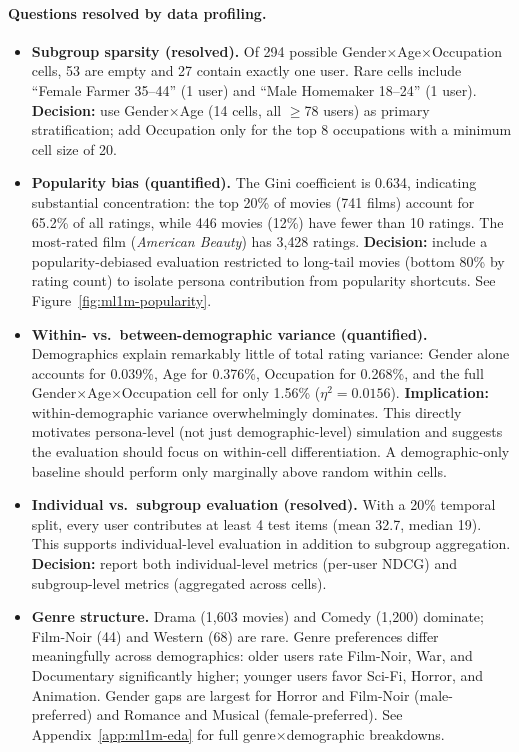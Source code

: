 \paragraph{Questions resolved by data profiling.}
\begin{itemize}
    \item \textbf{Subgroup sparsity (resolved).} Of 294 possible Gender$\times$Age$\times$Occupation cells, 53 are empty and 27 contain exactly one user. Rare cells include ``Female Farmer 35--44'' (1 user) and ``Male Homemaker 18--24'' (1 user). \textbf{Decision:} use Gender$\times$Age (14 cells, all $\geq$78 users) as primary stratification; add Occupation only for the top 8 occupations with a minimum cell size of 20.
    \item \textbf{Popularity bias (quantified).} The Gini coefficient is 0.634, indicating substantial concentration: the top 20\% of movies (741 films) account for 65.2\% of all ratings, while 446 movies (12\%) have fewer than 10 ratings. The most-rated film (\emph{American Beauty}) has 3{,}428 ratings. \textbf{Decision:} include a popularity-debiased evaluation restricted to long-tail movies (bottom 80\% by rating count) to isolate persona contribution from popularity shortcuts. See Figure~\ref{fig:ml1m-popularity}.
    \item \textbf{Within- vs.\ between-demographic variance (quantified).} Demographics explain remarkably little of total rating variance: Gender alone accounts for 0.039\%, Age for 0.376\%, Occupation for 0.268\%, and the full Gender$\times$Age$\times$Occupation cell for only 1.56\% ($\eta^2 = 0.0156$). \textbf{Implication:} within-demographic variance overwhelmingly dominates. This directly motivates persona-level (not just demographic-level) simulation and suggests the evaluation should focus on within-cell differentiation. A demographic-only baseline should perform only marginally above random within cells.
    \item \textbf{Individual vs.\ subgroup evaluation (resolved).} With a 20\% temporal split, every user contributes at least 4 test items (mean 32.7, median 19). This supports individual-level evaluation in addition to subgroup aggregation. \textbf{Decision:} report both individual-level metrics (per-user NDCG) and subgroup-level metrics (aggregated across cells).
    \item \textbf{Genre structure.} Drama (1{,}603 movies) and Comedy (1{,}200) dominate; Film-Noir (44) and Western (68) are rare. Genre preferences differ meaningfully across demographics: older users rate Film-Noir, War, and Documentary significantly higher; younger users favor Sci-Fi, Horror, and Animation. Gender gaps are largest for Horror and Film-Noir (male-preferred) and Romance and Musical (female-preferred). See Appendix~\ref{app:ml1m-eda} for full genre$\times$demographic breakdowns.
\end{itemize}

